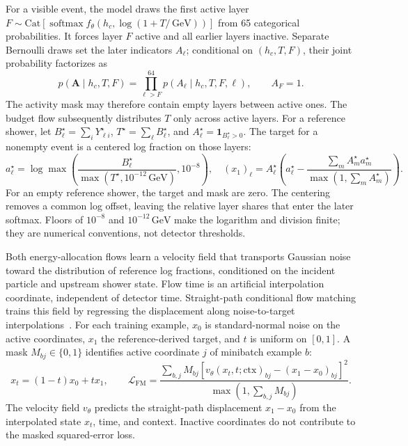 \documentclass[11pt]{article}
\newcommand{\GeV}{\,\mathrm{GeV}}
\begin{document}
For a visible event, the model draws the first active layer $F\sim\mathrm{Cat}[\operatorname{softmax}f_\theta(h_c,\log(1+T/\GeV))]$ from 65 categorical probabilities. It forces layer $F$ active and all earlier layers inactive. Separate Bernoulli draws set the later indicators $A_\ell$; conditional on $(h_c,T,F)$, their joint probability factorizes as
\begin{equation}
 p(\mathbf A\mid h_c,T,F)=\prod_{\ell>F}^{64}p(A_\ell\mid h_c,T,F,\ell),
 \qquad A_F=1.
 \label{eq:activity}
\end{equation}
The activity mask may therefore contain empty layers between active ones. The budget flow subsequently distributes $T$ only across active layers. For a reference shower, let $B_\ell^\star=\sum_iY_{\ell i}^\star$, $T^\star=\sum_\ell B_\ell^\star$, and $A_\ell^\star=\mathbf 1_{B_\ell^\star>0}$. The target for a nonempty event is a centered log fraction on those layers:
\begin{equation}
 a_\ell^\star=\log\max\!\left(
 \frac{B_\ell^\star}{\max(T^\star,10^{-12}\GeV)},10^{-8}\right),
 \quad (x_1)_\ell=A_\ell^\star\left(
 a_\ell^\star-\frac{\sum_m A_m^\star a_m^\star}
 {\max(1,\sum_m A_m^\star)}\right).
 \label{eq:profile_target}
\end{equation}
For an empty reference shower, the target and mask are zero. The centering removes a common log offset, leaving the relative layer shares that enter the later softmax. Floors of $10^{-8}$ and $10^{-12}\GeV$ make the logarithm and division finite; they are numerical conventions, not detector thresholds.

Both energy-allocation flows learn a velocity field that transports Gaussian noise toward the distribution of reference log fractions, conditioned on the incident particle and upstream shower state. Flow time is an artificial interpolation coordinate, independent of detector time. Straight-path conditional flow matching trains this field by regressing the displacement along noise-to-target interpolations~\cite{flowmatching}. For each training example, $x_0$ is standard-normal noise on the active coordinates, $x_1$ the reference-derived target, and $t$ is uniform on $[0,1]$. A mask $M_{bj}\in\{0,1\}$ identifies active coordinate $j$ of minibatch example $b$:
\begin{equation}
 x_t=(1-t)x_0+t x_1,\qquad
 \mathcal L_{\mathrm{FM}}=
 \frac{\sum_{b,j}M_{bj}
 [v_\theta(x_t,t;\mathrm{ctx})_{bj}-(x_1-x_0)_{bj}]^2}
 {\max(1,\sum_{b,j}M_{bj})}.
 \label{eq:cfm}
\end{equation}
The velocity field $v_\theta$ predicts the straight-path displacement $x_1-x_0$ from the interpolated state $x_t$, time, and context. Inactive coordinates do not contribute to the masked squared-error loss.
\end{document}
